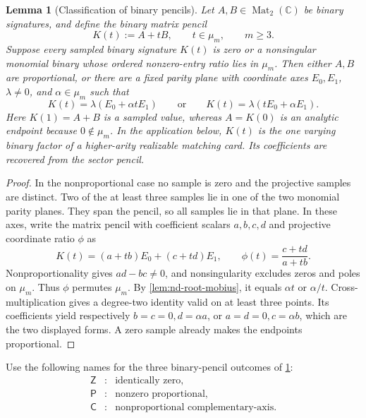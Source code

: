 \documentclass[11pt,letterpaper,onecolumn]{article}
\theoremstyle{plain}
\newtheorem{lemma}[lemma]{Lemma}
\theoremstyle{definition}
\theoremstyle{remark}
\newcommand{\Mat}{\operatorname{Mat}}
\begin{document}
\begin{lemma}[Classification of binary pencils]
\label{lem:nd-root-pencil}
Let \(A,B\in\Mat_2(\mathbb C)\) be binary signatures, and define the binary
matrix pencil
\[
 K(t):=A+tB,
 \qquad t\in\mu_m,\qquad m\ge3.
\]
Suppose every sampled binary signature \(K(t)\) is zero or a nonsingular
monomial binary whose ordered nonzero-entry ratio lies in \(\mu_m\).  Then
either \(A,B\) are proportional, or
there are a fixed parity plane with coordinate axes \(E_0,E_1\),
\(\lambda\ne0\), and \(\alpha\in\mu_m\) such that
\[
 K(t)=\lambda(E_0+\alpha tE_1)
 \qquad\text{or}\qquad
 K(t)=\lambda(tE_0+\alpha E_1).
\]
Here \(K(1)=A+B\) is a sampled value, whereas \(A=K(0)\) is an analytic
endpoint because \(0\notin\mu_m\).  In the application below, \(K(t)\) is
the one varying binary factor of a higher-arity realizable matching card. Its coefficients are recovered from the sector pencil.
\end{lemma}

\begin{proof}
In the nonproportional case no sample is zero and the projective samples are
distinct.  Two of the at least three samples lie in one of the two monomial
parity planes. They span the pencil, so all samples lie in that plane.  In
these axes, write the matrix pencil with coefficient scalars \(a,b,c,d\)
and projective coordinate ratio \(\phi\) as
\[
 K(t)=(a+tb)E_0+(c+td)E_1,
 \qquad \phi(t)=\frac{c+td}{a+tb}.
\]
Nonproportionality gives \(ad-bc\ne0\), and nonsingularity excludes zeros
and poles on \(\mu_m\).  Thus \(\phi\) permutes \(\mu_m\).  By
\cref{lem:nd-root-mobius}, it equals \(\alpha t\) or \(\alpha/t\).
Cross-multiplication gives a degree-two identity valid on at least three
points.  Its coefficients yield respectively
\(b=c=0,d=\alpha a\), or \(a=d=0,c=\alpha b\), which are the two displayed
forms.  A zero sample already makes the endpoints proportional.
\end{proof}

Use the following names for the three binary-pencil outcomes of
\cref{lem:nd-root-pencil}:
\[
 \begin{array}{ccl}
 \mathsf Z&:&\text{identically zero},\\
 \mathsf P&:&\text{nonzero proportional},\\
 \mathsf C&:&\text{nonproportional complementary-axis}.
 \end{array}
\]
\end{document}

